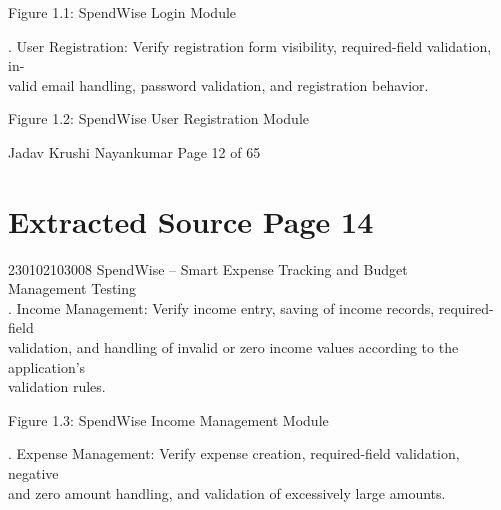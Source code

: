 \documentclass[12pt,a4paper]{report}
\begin{document}
\smallskip

\smallskip

\smallskip

\smallskip
Figure 1.1: SpendWise Login Module\\ 

\smallskip

. User Registration: Verify registration form visibility, required-field validation, in-\\ 
valid email handling, password validation, and registration behavior.\\ 

\smallskip

\smallskip

\smallskip

\smallskip
Figure 1.2: SpendWise User Registration Module\\ 

\smallskip

\smallskip

\smallskip
Jadav Krushi Nayankumar                                                    Page 12 of 65\\ 

\clearpage
\section*{Extracted Source Page 14}
230102103008                         SpendWise – Smart Expense Tracking and Budget\\ 
Management Testing\\ 

. Income Management: Verify income entry, saving of income records, required-field\\ 
validation, and handling of invalid or zero income values according to the application’s\\ 
validation rules.\\ 

\smallskip

\smallskip

\smallskip

\smallskip
Figure 1.3: SpendWise Income Management Module\\ 

\smallskip

. Expense Management: Verify expense creation, required-field validation, negative\\ 
and zero amount handling, and validation of excessively large amounts.\\ 
\end{document}

